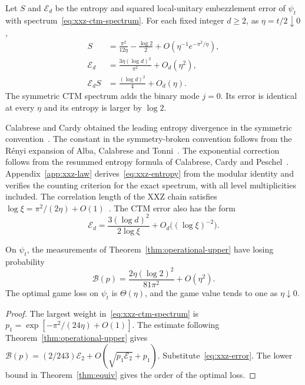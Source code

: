 \begin{theorem}\label{thm:xxz-law}
Let $S$ and $\mathcal E_d$ be the entropy and squared local-unitary
embezzlement error of $\psi_t$ with spectrum~\eqref{eq:xxz-ctm-spectrum}.
For each fixed integer $d\geq2$, as $\eta=t/2\downarrow0$,
\begin{align}
 S&=\frac{\pi^2}{12\eta}-\frac{\log2}{2}
      +O\!\left(\eta^{-1}e^{-\pi^2/\eta}\right),
 \label{eq:xxz-entropy}\\
 \mathcal E_d&=\frac{3\eta(\log d)^2}{\pi^2}
                    +O_d(\eta^2),\label{eq:xxz-error}\\
 \mathcal E_d S&=\frac{(\log d)^2}{4}
                    +O_d(\eta).\label{eq:xxz-product}
\end{align}
The symmetric CTM spectrum adds the binary mode $j=0$. Its error is
identical at every $\eta$ and its entropy is larger by $\log2$.
\end{theorem}

Calabrese and Cardy obtained the leading entropy divergence in the
symmetric convention~\cite[Eq.~(82)]{CalabreseCardy04}.
The constant in the symmetry-broken convention follows from the
R\'enyi expansion of Alba, Calabrese and Tonni~\cite[Eq.~(45)]{ACT18}.
The exponential correction follows from the resummed entropy formula
of Calabrese, Cardy and Peschel~\cite[Eq.~(19)]{CalabreseCardyPeschel10}.
Appendix~\ref{app:xxz-law} derives~\eqref{eq:xxz-entropy} from the modular
identity and verifies the counting criterion for the exact spectrum,
with all level multiplicities included.
The correlation length of the XXZ chain satisfies
$\log\xi=\pi^2/(2\eta)+O(1)$~\cite[Eq.~(44)]{ACT18}. The CTM error
also has the form
\[
 \mathcal E_d=\frac{3(\log d)^2}{2\log\xi}
                   +O_d\bigl((\log\xi)^{-2}\bigr).
\]

\begin{corollary}\label{cor:xxz-strategy}
On $\psi_t$, the measurements of Theorem~\ref{thm:operational-upper}
have losing probability
\[
 \mathcal B(p)=\frac{2\eta(\log2)^2}{81\pi^2}+O(\eta^2).
\]
The optimal game loss on $\psi_t$ is $\Theta(\eta)$, and the game value
tends to one as $\eta\downarrow0$.
\end{corollary}

\begin{proof}
The largest weight in~\eqref{eq:xxz-ctm-spectrum} is
$p_1=\exp[-\pi^2/(24\eta)+O(1)]$.
The estimate following Theorem~\ref{thm:operational-upper} gives
$\mathcal B(p)=(2/243)\mathcal E_2+
O(\sqrt{p_1\mathcal E_2}+p_1)$. Substitute~\eqref{eq:xxz-error}.
The lower bound in Theorem~\ref{thm:equiv} gives the order of the
optimal loss.
\end{proof}

